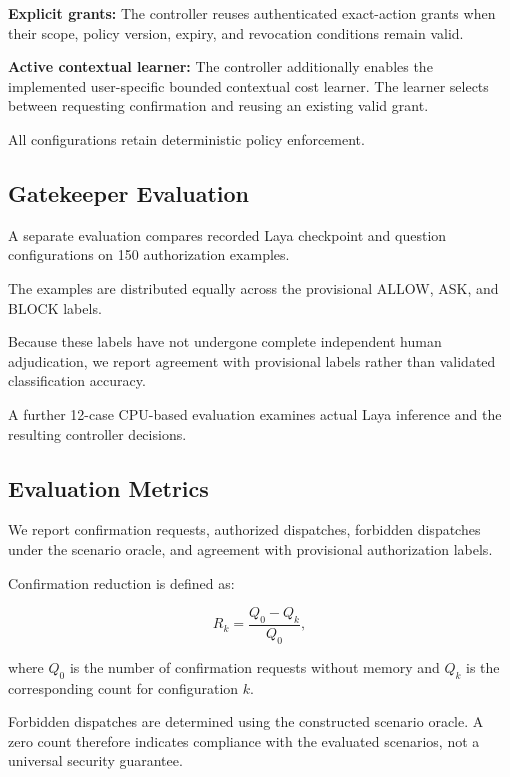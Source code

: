 \documentclass[10pt,conference]{IEEEtran}
\begin{document}
\textbf{Explicit grants:}
The controller reuses authenticated exact-action
grants when their scope, policy version,
expiry, and revocation conditions remain valid.

\textbf{Active contextual learner:}
The controller additionally enables the
implemented user-specific bounded contextual
cost learner. The learner selects between
requesting confirmation and reusing an
existing valid grant.

All configurations retain deterministic
policy enforcement.

\subsection{Gatekeeper Evaluation}

A separate evaluation compares recorded Laya
checkpoint and question configurations on
150 authorization examples.

The examples are distributed equally across
the provisional ALLOW, ASK, and BLOCK labels.

Because these labels have not undergone
complete independent human adjudication,
we report agreement with provisional labels
rather than validated classification accuracy.

A further 12-case CPU-based evaluation
examines actual Laya inference and the
resulting controller decisions.

\subsection{Evaluation Metrics}

We report confirmation requests, authorized
dispatches, forbidden dispatches under the
scenario oracle, and agreement with
provisional authorization labels.

Confirmation reduction is defined as:

\begin{equation}
R_k =
\frac{Q_0-Q_k}{Q_0},
\label{eq:confirmation_reduction}
\end{equation}

where $Q_0$ is the number of confirmation
requests without memory and $Q_k$ is the
corresponding count for configuration $k$.

Forbidden dispatches are determined using
the constructed scenario oracle. A zero
count therefore indicates compliance with
the evaluated scenarios, not a universal
security guarantee.

\end{document}
